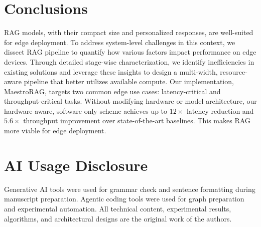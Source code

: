 \section{Conclusions}
\label{sec:conclusion}
RAG models, with their compact size and personalized responses, are well-suited for edge deployment. To address system-level challenges in this context, we dissect RAG pipeline to quantify how various factors impact performance on edge devices. Through detailed stage-wise characterization, we identify inefficiencies in existing solutions and leverage these insights to design a multi-width, resource-aware pipeline that better utilizes available compute. Our implementation, MaestroRAG, targets two common edge use cases: latency-critical and throughput-critical tasks. Without modifying hardware or model architecture, our hardware-aware, software-only scheme achieves up to $12\times$ latency reduction and $5.6\times$ throughput improvement over state-of-the-art baselines. This makes RAG more viable for edge deployment.

\section{AI Usage Disclosure}
Generative AI tools were used for grammar check and sentence formatting during manuscript preparation. Agentic coding tools were used for graph preparation and experimental automation. All technical content, experimental results, algorithms, and architectural designs are the original work of the authors.
%